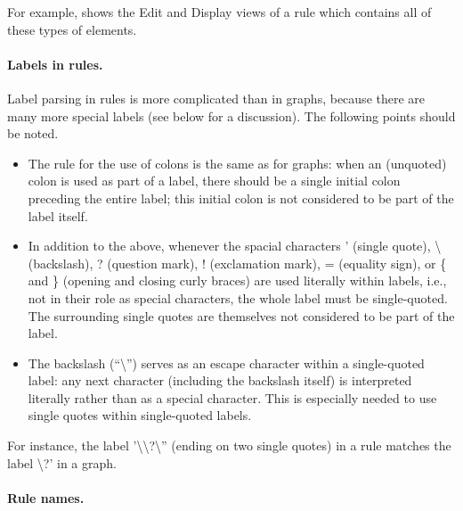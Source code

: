 For example,  shows the Edit and Display views of a rule
which contains all of these types of elements.


\paragraph{Labels in rules.}

Label parsing in rules is more complicated than in graphs, because there are
many more special labels (see below for a discussion). The following points
should be noted.
%
\begin{itemize}\noitemsep
\item The rule for the use of colons is the same as for graphs: when an
  (unquoted) colon is used as part of a label, there should be a single initial
  colon preceding the entire label; this initial colon is not considered to be
  part of the label itself.

\item In addition to the above, whenever the spacial characters \textsf{'}
  (single quote), \textsf{\textbackslash} (backslash), \textsf{?} (question
  mark), \textsf{!}  (exclamation mark), \textsf{=} (equality sign), or
  \textsf{\{} and \textsf{\}} (opening and closing curly braces) are used
  literally within labels, i.e., not in their role as special characters, the
  whole label must be single-quoted. The surrounding single quotes are
  themselves not considered to be part of the label.

\item The backslash (``\textsf{\textbackslash}'') serves as an escape character
  within a single-quoted label: any next character (including the backslash
  itself) is interpreted literally rather than as a special character. This is
  especially needed to use single quotes within single-quoted labels.
\end{itemize}
%
For instance, the label \textsf{'\textbackslash\textbackslash?\textbackslash''}
(ending on two single quotes) in a rule matches the label
\textsf{\textbackslash?'} in a graph.

\paragraph{Rule names.}

